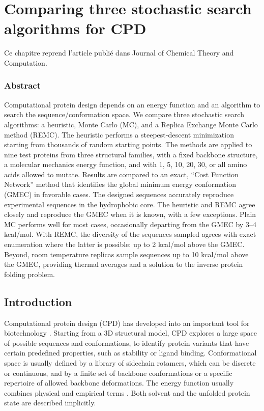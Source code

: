 \chapter{Comparing three stochastic search algorithms for CPD}
\label{chap:Comparaison}


Ce chapitre reprend l'article publié dans \og Journal of Chemical Theory and Computation\fg \cite{Mignon16}.


\subsection*{Abstract}
Computational protein design depends on an energy function and an algorithm to search the sequence/conformation space.
We compare three stochastic search algorithms: a heuristic, Monte Carlo (MC), and a Replica Exchange Monte Carlo method (REMC).
The heuristic performs a steepest-descent minimization starting from thousands of random starting points.
The methods are applied to nine test proteins from three structural families, with a fixed backbone structure, a molecular mechanics energy function, and with 1, 5, 10, 20, 30, or all amino acids allowed to mutate.
Results are compared to an exact, “Cost Function Network” method that identifies the global minimum energy conformation (GMEC) in favorable cases.
The designed sequences accurately reproduce experimental sequences in the hydrophobic core.
The heuristic and REMC agree closely and reproduce the GMEC when it is known, with a few exceptions.
Plain MC performs well for most cases, occasionally departing from the GMEC by 3–4 kcal/mol.
With REMC, the diversity of the sequences sampled agrees with exact enumeration where the latter is possible: up to 2 kcal/mol above the GMEC.
Beyond, room temperature replicas sample sequences up to 10 kcal/mol above the GMEC, providing thermal averages and a solution to the inverse protein folding problem.

\pagebreak

\section{Introduction}
Computational protein design (CPD) has developed into an important tool for biotechnology \cite{Dantas03,Kuhlman06,Lippow07,Saven11,Feldmeier13,Tinberg13}.
Starting from a 3D structural model, CPD explores a large space of possible sequences and conformations, to identify protein variants that have certain predefined properties, such as stability or ligand binding.
Conformational space is usually defined by a library of sidechain rotamers, which can be discrete or continuous, and by a finite set of backbone conformations or a specific repertoire of allowed backbone deformations.
The energy function usually combines physical and empirical terms \cite{Pokala04,Samish11,Li13}.
Both solvent and the unfolded protein state are described implicitly.


